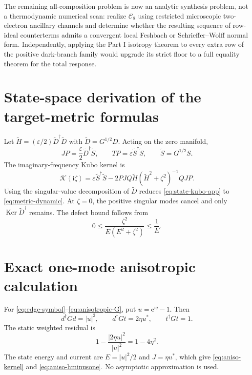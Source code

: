 \documentclass[11pt]{article}
\theoremstyle{definition}
\theoremstyle{remark}
\newcommand{\cK}{\mathcal K}
\newcommand{\cC}{\mathcal C}
\newcommand{\Ker}{\operatorname{Ker}}
\newcommand{\I}{\mathrm i}
\newcommand{\e}{\mathrm e}
\newcommand{\abs}[1]{\left\lvert #1\right\rvert}
\newcommand{\eps}{\varepsilon}
\begin{document}
The remaining all-composition problem is now an analytic synthesis problem,
not a thermodynamic numerical scan: realize $\cC_8$ using restricted
microscopic two-electron ancillary channels and determine whether the resulting
sequence of row-ideal counterterms admits a convergent local Feshbach or
Schrieffer--Wolff normal form.  Independently, applying the Part I isotropy
theorem to every extra row of the positive dark-branch family would upgrade its
strict floor to a full equality theorem for the total response.

\appendix

\section{State-space derivation of the target-metric formulas}

Let $\widetilde H=(\eps/2)\widetilde D^\dagger\widetilde D$ with
$\widetilde D=G^{1/2}D$.  Acting on the zero manifold,
\begin{equation}
 JP=\frac\eps2\widetilde D^\dagger\widetilde S,
 \qquad
 TP=\eps\widetilde S^\dagger\widetilde S,
 \qquad
 \widetilde S=G^{1/2}S.
\end{equation}
The imaginary-frequency Kubo kernel is
\begin{equation}
 \cK(\I\zeta)
 =\eps\widetilde S^\dagger\widetilde S
 -2PJQ\widetilde H(\widetilde H^2+\zeta^2)^{-1}QJP.
 \label{eq:state-kubo-app}
\end{equation}
Using the singular-value decomposition of $\widetilde D$ reduces
\eqref{eq:state-kubo-app} to \eqref{eq:metric-dynamic}.  At $\zeta=0$, the
positive singular modes cancel and only $\Ker\widetilde D^\dagger$ remains.
The defect bound follows from
\begin{equation}
 0\le\frac{\zeta^2}{E(E^2+\zeta^2)}\le\frac1E.
\end{equation}

\section{Exact one-mode anisotropic calculation}

For \eqref{eq:edge-symbol}--\eqref{eq:anisotropic-G}, put
$u=\e^{\I q}-1$.  Then
\begin{equation}
 d^\dagger Gd=\abs u^2,
 \qquad
 d^\dagger Gt=2\eta u^*,
 \qquad
 t^\dagger Gt=1.
\end{equation}
The static weighted residual is
\begin{equation}
 1-\frac{\abs{2\eta u}^2}{\abs u^2}=1-4\eta^2.
\end{equation}
The state energy and current are $E=\abs u^2/2$ and $J=\eta u^*$, which give
\eqref{eq:aniso-kernel} and \eqref{eq:aniso-hminusone}.  No asymptotic
approximation is used.
\end{document}
